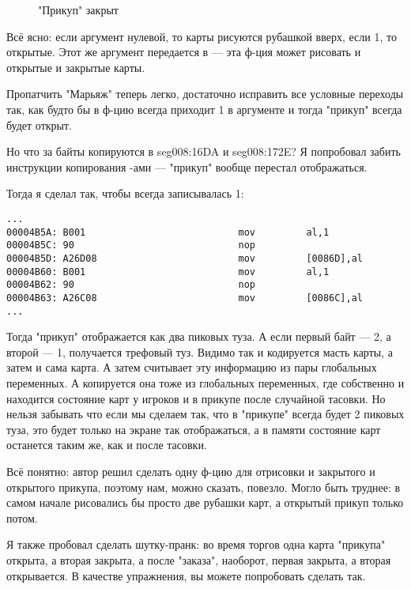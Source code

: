 \begin{figure}[H]
\centering
{}
\caption{"Прикуп" закрыт}
\end{figure}

Всё ясно: если аргумент  нулевой, то карты рисуются рубашкой вверх, если 1, то открытые.
Этот же аргумент передается в  --- эта ф-ция может рисовать и открытые и закрытые карты.

Пропатчить "Марьяж" теперь легко, достаточно исправить все условные переходы так, как будто бы в ф-цию
всегда приходит 1 в аргументе и тогда "прикуп" всегда будет открыт.

Но что за байты копируются в seg008:16DA и seg008:172E?
Я попробовал забить инструкции копирования \MOV \NOP{}-ами --- "прикуп" вообще перестал отображаться.

Тогда я сделал так, чтобы всегда записывалась 1:

\begin{lstlisting}
...
00004B5A: B001                           mov         al,1
00004B5C: 90                             nop
00004B5D: A26D08                         mov         [0086D],al
00004B60: B001                           mov         al,1
00004B62: 90                             nop
00004B63: A26C08                         mov         [0086C],al
...
\end{lstlisting}

Тогда "прикуп" отображается как два пиковых туза.
А если первый байт --- 2, а второй --- 1, получается трефовый туз.
Видимо так и кодируется масть карты, а затем и сама карта.
А  затем считывает эту информацию из пары глобальных переменных.
А копируется она тоже из глобальных переменных, где собственно и находится состояние карт у игроков и в прикупе
после случайной тасовки.
Но нельзя забывать что если мы сделаем так, что в "прикупе" всегда будет 2 пиковых туза, это будет только
на экране так отображаться, а в памяти состояние карт останется таким же, как и после тасовки.

Всё понятно: автор решил сделать одну ф-цию для отрисовки и закрытого и открытого прикупа, поэтому нам, можно сказать,
повезло.
Могло быть труднее: в самом начале рисовались бы просто две рубашки карт, а открытый прикуп только потом.

Я также пробовал сделать шутку-пранк: во время торгов одна карта "прикупа" открыта, а вторая закрыта, а после "заказа",
наоборот, первая закрыта, а вторая открывается. В качестве упражнения, вы можете попробовать сделать так.

